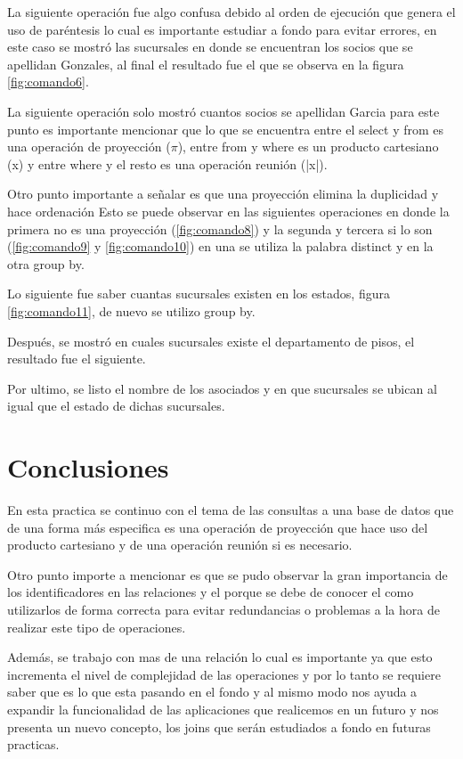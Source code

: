 \documentclass[12pt, titlepage]{article}
\begin{document}
La siguiente operación fue algo confusa debido al orden de ejecución que genera el uso de paréntesis lo cual es importante estudiar a fondo para evitar errores, en este caso se mostró las sucursales en donde se encuentran los socios que se apellidan Gonzales, al final el resultado fue el que se observa en la figura \ref{fig:comando6}.

La siguiente operación solo mostró cuantos socios se apellidan Garcia para este punto es importante mencionar que lo que se encuentra entre el select y from es una operación de proyección ($\pi$), entre from y where es un producto cartesiano (x) y entre where y el resto es una operación reunión (|x|).

Otro punto importante a señalar es que una proyección elimina la duplicidad y hace ordenación Esto se puede observar en las siguientes operaciones en donde la primera no es una proyección (\ref{fig:comando8}) y la segunda y tercera si lo son (\ref{fig:comando9} y \ref{fig:comando10}) en una se utiliza la palabra distinct y en la otra group by.

Lo siguiente fue saber cuantas sucursales existen en los estados, figura \ref{fig:comando11}, de nuevo se utilizo group by.

Después, se mostró en cuales sucursales existe el departamento de pisos, el resultado fue el siguiente.

Por ultimo, se listo el nombre de los asociados y en que sucursales se ubican al igual que el estado de dichas sucursales.
\section{Conclusiones}
En esta practica se continuo con el tema de las consultas a una base de datos que de una forma más especifica es una operación de proyección que hace uso del producto cartesiano y de una operación reunión si es necesario.

Otro punto importe a mencionar es que se pudo observar la gran importancia de los identificadores en las relaciones y el porque se debe de conocer el como utilizarlos de forma correcta para evitar redundancias o problemas a la hora de realizar este tipo de operaciones.

Además, se trabajo con mas de una relación lo cual es importante ya que esto incrementa el nivel de complejidad de las operaciones y por lo tanto se requiere saber que es lo que esta pasando en el fondo y al mismo modo nos ayuda a expandir la funcionalidad de las aplicaciones que realicemos en un futuro y nos presenta un nuevo concepto, los joins que serán estudiados a fondo en futuras practicas.
 

\end{document}
